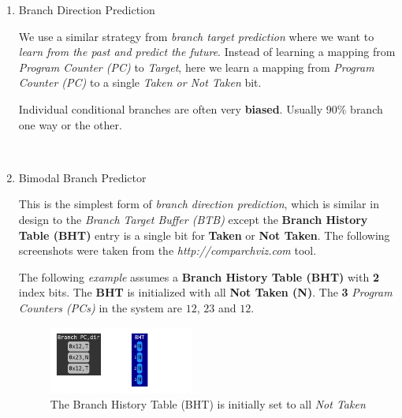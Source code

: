 \documentclass[12pt]{article}
\newenvironment{QandA}{\begin{enumerate}[label=\bfseries\arabic*.]\bfseries}
                      {\end{enumerate}}
\newenvironment{answered}{\par\quad\normalfont}{}
\begin{document}
\begin{QandA}
\begin{answered}
\textit{(b) How do we know when to use the RAS?}

There is usually another level of prediction that will associate a \textit{Program Counter (PC)} with whether the \textbf{Return Address Stack (RAS)} is to be used or not. This will involve additional bits and hardware. 
\end{answered}

\ 

\item Branch Direction Prediction
\begin{answered}
We use a similar strategy from \textit{branch target prediction} where we want to \textit{learn from the past and predict the future}. Instead of learning a mapping from \textit{Program Counter (PC)} to \textit{Target}, here we learn a mapping from \textit{Program Counter (PC)} to a single \textit{Taken or Not Taken} bit. 

Individual conditional branches are often very \textbf{biased}. Usually 90\% branch one way or the other.
\end{answered}

\ 

\item Bimodal Branch Predictor
\begin{answered}
This is the simplest form of \textit{branch direction prediction}, which is similar in design to the \textit{Branch Target Buffer (BTB)} except the \textbf{Branch History Table (BHT)} entry is a single bit for \textbf{Taken} or \textbf{Not Taken}. The following screenshots were taken from the \textit{http://comparchviz.com} tool.

The following \textit{example} assumes a \textbf{Branch History Table (BHT)} with \textbf{2} index bits. The \textbf{BHT} is initialized with all \textbf{Not Taken (N)}. The \textbf{3} \textit{Program Counters (PCs)} in the system are $12$, $23$ and $12$.

\begin{figure}[!ht]
\centering
\includegraphics[width=0.45\textwidth]{chapter7_imgs/bbp/bbp000.png}
\caption{The Branch History Table (BHT) is initially set to all \textit{Not Taken}}
\label{bbp000}
\end{figure}


\end{answered}
\end{QandA}
\end{document}
